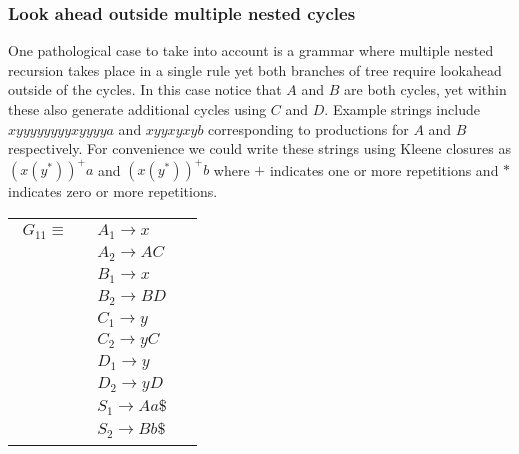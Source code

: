 \documentclass[a4paper,11pt]{article}
\begin{document}
\subsubsection{Look ahead outside multiple nested cycles}
One pathological case to take into account is a grammar where multiple nested recursion takes place in a single rule yet both branches of tree require lookahead outside of the cycles. In this case notice that $A$ and $B$ are both 
cycles, yet within these also generate additional cycles using $C$ and $D$. Example strings include $xyyyyyyyyxyyyya$ and $xyyxyxyb$ corresponding to productions for $A$ and $B$ respectively.
For convenience we could write these strings using Kleene closures as $(x(y^*))^+a$ and $(x(y^*))^+b$ where $+$ indicates one or more repetitions and $*$ indicates zero or more repetitions.

\begin{tabular}[t]{cl}
\parbox{.3\textwidth}{
\begin{align*}
G_{11} \equiv \quad & A_1 \rightarrow x\\
                  & A_2 \rightarrow A C \\
                  & B_1 \rightarrow x\\
                  & B_2 \rightarrow B D\\
                  & C_1 \rightarrow y\\
                  & C_2 \rightarrow y C\\
                  & D_1 \rightarrow y\\
                  & D_2 \rightarrow y D\\
                  & S_1 \rightarrow A a \$\\
                  & S_2 \rightarrow B b \$
\end{align*}}
\parbox{.6\textwidth}{}
\end{tabular}
\end{document}
